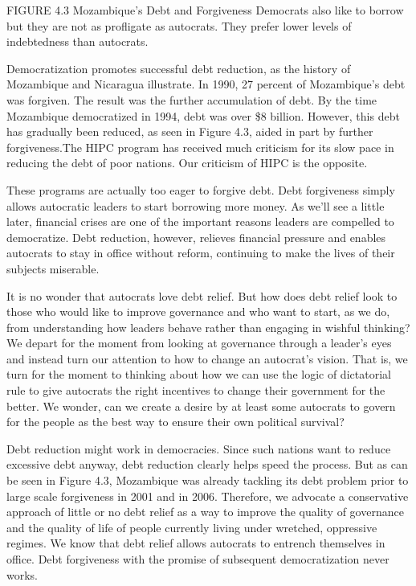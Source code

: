 \documentclass[10pt]{article}
\begin{document}
{\large FIGURE 4.3 Mozambique's Debt and Forgiveness Democrats also like to
borrow but they are not as profligate as autocrats. They prefer lower levels of
indebtedness than autocrats.}

{\large Democratization promotes successful debt reduction, as the history of
Mozambique and Nicaragua illustrate. In 1990, 27 percent of Mozambique's debt was
forgiven. The result was the further accumulation of debt. By the time Mozambique
democratized in 1994, debt was over \$8 billion. However, this debt has gradually
been reduced, as seen in Figure 4.3, aided in part by further forgiveness.The
HIPC program has received much criticism for its slow pace in reducing the debt
of poor nations. Our criticism of HIPC is the opposite.}

{\large These programs are actually too eager to forgive debt. Debt forgiveness
simply allows autocratic leaders to start borrowing more money. As we'll see a
little later, financial crises are one of the important reasons leaders are
compelled to democratize. Debt reduction, however, relieves financial pressure
and enables autocrats to stay in office without reform, continuing to make the
lives of their subjects miserable.}

{\large It is no wonder that autocrats love debt relief. But how does debt
relief look to those who would like to improve governance and who want to start,
as we do, from understanding how leaders behave rather than engaging in wishful
thinking? We depart for the moment from looking at governance through a leader's
eyes and instead turn our attention to how to change an autocrat's vision. That
is, we turn for the moment to thinking about how we can use the logic of
dictatorial rule to give autocrats the right incentives to change their
government for the better. We wonder, can we create a desire by at least some
autocrats to govern for the people as the best way to ensure their own political
survival?}

{\large Debt reduction might work in democracies. Since such nations want to
reduce excessive debt anyway, debt reduction clearly helps speed the process. But
as can be seen in Figure 4.3, Mozambique was already tackling its debt problem
prior to large scale forgiveness in 2001 and in 2006. Therefore, we advocate a
conservative approach of little or no debt relief as a way to improve the quality
of governance and the quality of life of people currently living under wretched,
oppressive regimes. We know that debt relief allows autocrats to entrench
themselves in office. Debt forgiveness with the promise of subsequent
democratization never works.}
\end{document}
